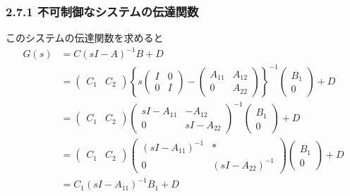 \begin{frame}[t]
\frametitle{2.7.1 不可制御なシステムの伝達関数}
このシステムの伝達関数を求めると
\begin{align}
	G(s) & = C(sI-A)^{-1}B + D
\nonumber \\
	&= 
		\left(\begin{array}{cc}
			{C}_1 & {C}_2 
		\end{array}\right)
		\left\{ 
			s
			\left(\begin{array}{cc}
				I & 0 \\
				0 & I 
			\end{array}\right)
			-
			\left(\begin{array}{cc}
				{A}_{11} & {A}_{12} \\
				0 & {A}_{22}
			\end{array}\right)
		\right\} ^{-1}
		\left(\begin{array}{c}
			{B}_1 \\
			0
		\end{array}\right)
		+ D
\nonumber \\
	&= 
		\left(\begin{array}{cc}
			{C}_1 & {C}_2 
		\end{array}\right)
		\left(\begin{array}{cc}
			sI - {A}_{11} & - {A}_{12} \\
			0             & sI - {A}_{22}
		\end{array}\right) ^{-1}
		\left(\begin{array}{c}
			{B}_1 \\
			0
		\end{array}\right)
		+ D
\nonumber \\
	&= 
		\left(\begin{array}{cc}
			{C}_1 & {C}_2 
		\end{array}\right)
		\left(\begin{array}{cc}
			(sI - {A}_{11})^{-1} & * \\
			0                    & (sI - {A}_{22})^{-1}
		\end{array}\right) 
		\left(\begin{array}{c}
			{B}_1 \\
			0
		\end{array}\right)
		+ D
\nonumber \\
	&= 
		{C}_1 (sI - {A}_{11})^{-1} {B}_1 + D
\end{align}
\end{frame}

